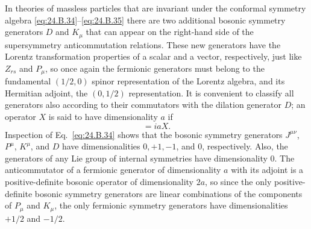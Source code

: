 In theories of massless particles that are invariant under the conformal
symmetry algebra \eqref{eq:24.B.34}--\eqref{eq:24.B.35} there are two
additional bosonic symmetry generators \(D\) and \(K_\mu\) that can appear
on the right-hand side of the supersymmetry anticommutation relations.
These new generators have the Lorentz transformation properties of a scalar
and a vector, respectively, just like \(Z_{rs}\) and \(P_\mu\), so once
again the fermionic generators must belong to the fundamental \((1/2,0)\)
spinor representation of the Lorentz algebra, and its Hermitian adjoint,
the \((0,1/2)\) representation. It is convenient to classify all generators
also according to their commutators with the dilation generator \(D\); an
operator \(X\) is said to have dimensionality \(a\) if
\begin{equation}
[X,D]=iaX.
\tag{25.2.39}\label{eq:25.2.39}
\end{equation}
Inspection of Eq.~\eqref{eq:24.B.34} shows that the bosonic symmetry
generators \(J^{\mu\nu}\), \(P^\mu\), \(K^\mu\), and \(D\) have
dimensionalities \(0,+1,-1\), and \(0\), respectively. Also, the
generators of any Lie group of internal symmetries have dimensionality
0. The anticommutator of a fermionic generator of dimensionality \(a\)
with its adjoint is a positive-definite bosonic operator of dimensionality
\(2a\), so since the only positive-definite bosonic symmetry generators
are linear combinations of the components of \(P_\mu\) and \(K_\mu\), the
only fermionic symmetry generators have dimensionalities \(+1/2\) and
\(-1/2\).

